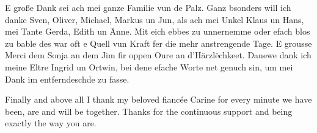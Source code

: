 
E große Dank sei ach
mei ganze Familie vun de Palz.
Ganz bsonders will ich danke Sven, Oliver,
Michael, Markus un Jun,
als ach mei Unkel Klaus un Hans,
mei Tante Gerda, Edith un Änne.
Mit eich ebbes zu unnernemme oder efach blos zu bable
des war oft e Quell vun Kraft fer die mehr anstrengende Tage.
E grousse Merci dem Sonja an dem Jim
fir oppen Oure an d'Härzlëchkeet.
Danewe dank ich meine Eltre Ingrid un Ortwin,
bei dene efache Worte net genuch sin,
um mei Dank im entferndeschde zu fasse.


Finally and above all I thank my beloved fianc\'ee Carine
for every minute we have been, are and will be together.
Thanks for the continuous support and being exactly the way you are.
